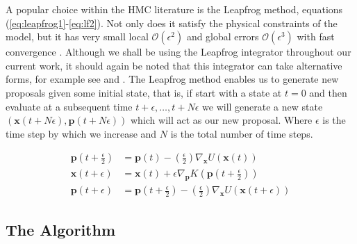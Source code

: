 \documentclass[twoside]{article}
\begin{document}
A popular choice within the HMC literature is the Leapfrog method, equations (\ref{eq:leapfrog1}-\ref{eq:lf2}). Not only does it satisfy the physical constraints of the model, but it has very small local  $\mathcal{O}(\epsilon^{2})$ and global errors $\mathcal{O}(\epsilon^{3})$ with fast convergence \citep{neal2011mcmc}. Although we shall be using the Leapfrog integrator throughout our current work, it should again be noted that this integrator can take alternative forms, for example see \citep{girolami2011riemann}\citep{nishimura2017discontinuous} and \citep{blanes2012explicit}. The Leapfrog method enables us to generate new proposals given some initial state, that is, if start with a state at $t = 0$ and then evaluate at a subsequent time $t + \epsilon , \hdots, t + N\epsilon$ we will generate a new state $(\textbf{x}(t + N\epsilon),\textbf{p}(t + N\epsilon))$ which will act as our new proposal. Where $\epsilon$ is the time step by which we increase and $N$ is the total number of time steps.

\begin{align}
\label{eq:leapfrog1}
\textbf{p}(t + \frac{\epsilon}{2}) &= \textbf{p}(t) - \left(\frac{\epsilon}{2}\right) \nabla_\textbf{x}U(\textbf{x}(t)) \\
\textbf{x}(t + \epsilon) &= \textbf{x}(t) + \epsilon \nabla_{\textbf{p}}K(\textbf{p}(t + \frac{\epsilon}{2}))\\
\label{eq:lf2}
\textbf{p}(t + \epsilon) &= \textbf{p}(t + \frac{\epsilon}{2}) - \left(\frac{\epsilon}{2}\right)\nabla_{\textbf{x}} U(\textbf{x}(t+\epsilon))
\end{align}
\subsection{The Algorithm}
\end{document}
